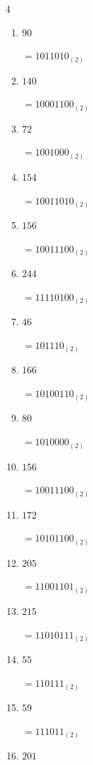 \begin{multicols}{4}
\begin{enumerate}
        $=1001111_{(2)}$

  \item $90$

        $=1011010_{(2)}$

  \item $140$

        $=10001100_{(2)}$

  \item $72$

        $=1001000_{(2)}$

\columnbreak %

  \item $154$

        $=10011010_{(2)}$

  \item $156$

        $=10011100_{(2)}$

  \item $244$

        $=11110100_{(2)}$

  \item $46$

        $=101110_{(2)}$

  \item $166$

        $=10100110_{(2)}$

  \item $80$

        $=1010000_{(2)}$

  \item $156$

        $=10011100_{(2)}$

  \item $172$

        $=10101100_{(2)}$

  \item $205$

        $=11001101_{(2)}$

  \item $215$

        $=11010111_{(2)}$

  \item $55$

        $=110111_{(2)}$

  \item $59$

        $=111011_{(2)}$

  \item $201$


\end{enumerate}
\end{multicols}
